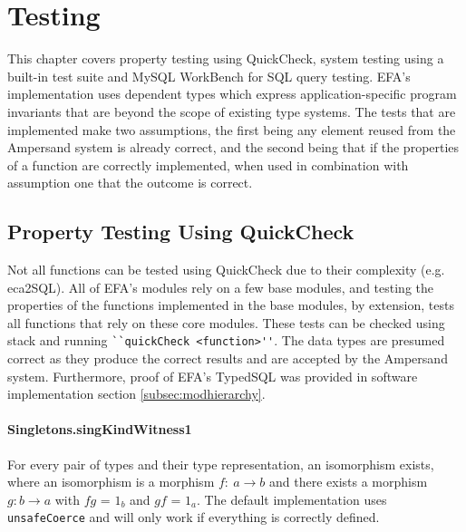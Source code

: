 \chapter{Testing}

This chapter covers property testing using QuickCheck, system testing using a 
built-in test suite and MySQL WorkBench for SQL query testing. EFA's 
implementation uses dependent types which express application-specific program 
invariants that are beyond the scope of existing type systems. The tests that 
are implemented make two assumptions, the first being any element reused from 
the Ampersand system is already correct, and the second being that if the 
properties of a function are correctly implemented, when used in combination 
with assumption one that the outcome is correct.

\section{Property Testing Using QuickCheck}
Not all functions can be tested using QuickCheck due to their complexity (e.g. 
eca2SQL). All of EFA's modules rely on a few base modules, and testing the 
properties of the functions implemented in the base modules, by extension, 
tests all functions that rely on these core modules. These tests can be checked 
using stack and running \verb|``quickCheck <function>''|. The data types are 
presumed correct as they produce the correct results and are accepted by the 
Ampersand system. Furthermore, proof of EFA's TypedSQL was provided in software 
implementation section \ref{subsec:modhierarchy}.

\subsubsection*{Singletons.singKindWitness1}
For every pair of types and their type representation, an isomorphism exists,
where an isomorphism is a morphism $f:\ a \rightarrow b$ and there exists a
morphism $g: b \rightarrow a$ with $fg$ = $1_b$ and $gf$ = $1_a$. The default
implementation uses \lstinline{unsafeCoerce} and will only work if everything
is correctly defined.
         

